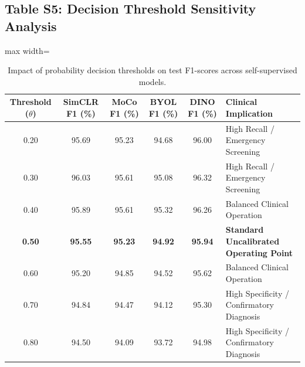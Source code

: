 \documentclass[11pt,a4paper]{article}
\begin{document}
\clearpage

\subsection*{Table S5: Decision Threshold Sensitivity Analysis}
\begin{table}[htbp]
\centering
\caption{Impact of probability decision thresholds on test F1-scores across self-supervised models.}
\label{tab:s5_thresholds}
\begin{adjustbox}{max width=\textwidth}
\begin{tabular}{c c c c c l}
\toprule
\textbf{Threshold ($\theta$)} & \textbf{SimCLR F1 (\%)} & \textbf{MoCo F1 (\%)} & \textbf{BYOL F1 (\%)} & \textbf{DINO F1 (\%)} & \textbf{Clinical Implication} \\
\midrule
0.20 & 95.69 & 95.23 & 94.68 & 96.00 & High Recall / Emergency Screening \\
0.30 & 96.03 & 95.61 & 95.08 & 96.32 & High Recall / Emergency Screening \\
0.40 & 95.89 & 95.61 & 95.32 & 96.26 & Balanced Clinical Operation \\
\textbf{0.50} & \textbf{95.55} & \textbf{95.23} & \textbf{94.92} & \textbf{95.94} & \textbf{Standard Uncalibrated Operating Point} \\
0.60 & 95.20 & 94.85 & 94.52 & 95.62 & Balanced Clinical Operation \\
0.70 & 94.84 & 94.47 & 94.12 & 95.30 & High Specificity / Confirmatory Diagnosis \\
0.80 & 94.50 & 94.09 & 93.72 & 94.98 & High Specificity / Confirmatory Diagnosis \\
\bottomrule
\end{tabular}
\end{adjustbox}
\end{table}
\end{document}

